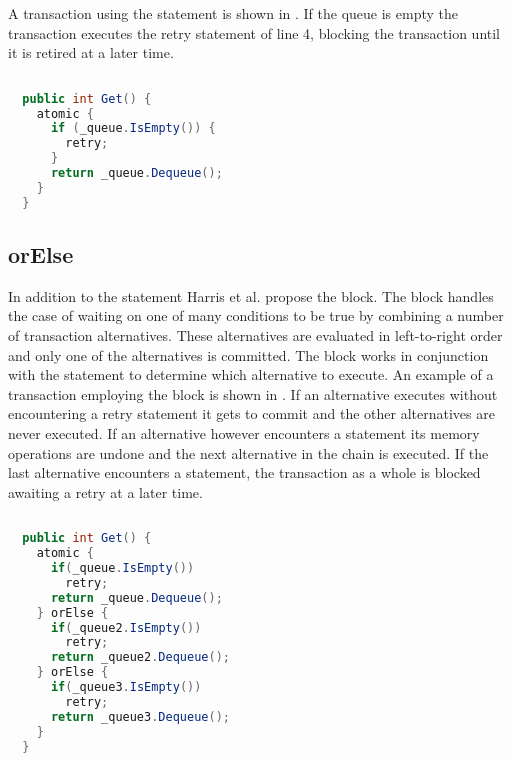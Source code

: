 A transaction using the  statement is shown in . If the queue is empty the transaction executes the retry statement of line 4, blocking the transaction until it is retired at a later time.
\begin{lstlisting}[label=lst:stm_retry,
  caption={Queue with retry},
  language=Java,  
  showspaces=false,
  showtabs=false,
  breaklines=true,
  showstringspaces=false,
  breakatwhitespace=true,
  commentstyle=\color{greencomments},
  keywordstyle=\color{bluekeywords},
  stringstyle=\color{redstrings},
  morekeywords={atomic, retry, orElse}]  % Start your code-block
  
  public int Get() {
    atomic {
      if (_queue.IsEmpty()) {
        retry;
      }
      return _queue.Dequeue();
    }
  }
\end{lstlisting}

\subsection{orElse}
In addition to the  statement Harris et al. propose the  block. The  block handles the case of waiting on one of many conditions to be true by combining a number of transaction alternatives. These alternatives are evaluated in left-to-right order and only one of the alternatives is committed\cite[p. 52]{harris2005composable}. The  block works in conjunction with the  statement to determine which alternative to execute. An example of a transaction employing the  block is shown in . If an alternative executes without encountering a retry statement it gets to commit and the other alternatives are never executed\cite[p. 74]{harris2010transactional}. If an alternative however encounters a  statement its memory operations are undone and the next alternative in the chain is executed\cite[p. 74]{harris2010transactional}. If the last alternative encounters a  statement, the transaction as a whole is blocked awaiting a retry at a later time\cite[p. 74]{harris2010transactional}.

\begin{lstlisting}[label=lst:stm_orelse,
  caption={Queue with orElse},
  language=Java,  
  showspaces=false,
  showtabs=false,
  breaklines=true,
  showstringspaces=false,
  breakatwhitespace=true,
  commentstyle=\color{greencomments},
  keywordstyle=\color{bluekeywords},
  stringstyle=\color{redstrings},
  morekeywords={atomic, retry, orElse}]  % Start your code-block
  
  public int Get() {
    atomic {
      if(_queue.IsEmpty())
        retry;
      return _queue.Dequeue();
    } orElse {
      if(_queue2.IsEmpty())
        retry;
      return _queue2.Dequeue();
    } orElse {
      if(_queue3.IsEmpty())
        retry;
      return _queue3.Dequeue();
    }
  }
\end{lstlisting}

%
\worksheetend